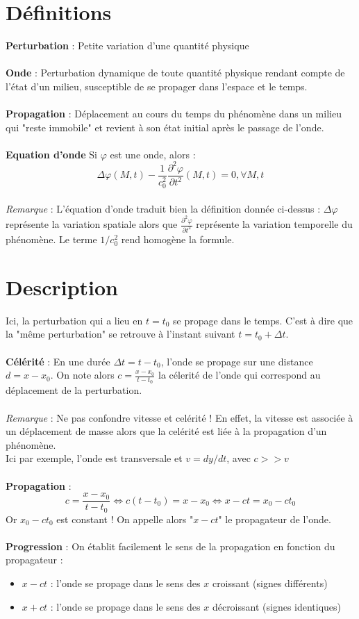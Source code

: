 \section{Définitions}
\noindent\textbf{Perturbation} : Petite variation d'une quantité physique \\ \\
\textbf{Onde} : Perturbation dynamique de toute quantité physique rendant compte de l'état d'un milieu, susceptible de se propager dans l'espace et le temps.\\ \\
\textbf{Propagation} : Déplacement au cours du temps du phénomène dans un milieu qui "reste immobile" et revient à son état initial après le passage de l'onde. \\ \\
\textbf{Equation d'onde} Si $\varphi$ est une onde, alors :
\[\Delta\varphi(M,t)-\frac{1}{c_0^2}\frac{\partial^2\varphi}{\partial t^2}(M,t)=0, \forall M, t\]\\
\emph{Remarque} : L'équation d'onde traduit bien la définition donnée ci-dessus : $\Delta\varphi$ représente la variation spatiale alors que $\frac{\partial^2\varphi}{\partial t^2}$ représente la variation temporelle du phénomène. Le terme $1/c_0^2$ rend homogène la formule. 
\section{Description}
Ici, la perturbation qui a lieu en $t=t_0$ se propage dans le temps. C'est à dire que la "même perturbation" se retrouve à l'instant suivant $t=t_0+\Delta t$.\\ \\
\textbf{Célérité} : En une durée $\Delta t = t-t_0$, l'onde se propage sur une distance $d=x-x_0$. On note alors $c=\frac{x-x_0}{t-t_0}$ la célerité de l'onde qui correspond au déplacement de la perturbation.\\ \\
\emph{Remarque} : Ne pas confondre vitesse et celérité ! En effet, la vitesse est associée à un déplacement de masse alors que la celérité est liée à la propagation d'un phénomène. \\
Ici par exemple, l'onde est transversale et $v=dy/dt$, avec $c>>v$ \\ \\
\textbf{Propagation} : \[ c=\frac{x-x_0}{t-t_0} \Leftrightarrow c(t-t_0) = x-x_0 \Leftrightarrow x-ct=x_0-ct_0 \]
Or $x_0-ct_0$ est constant ! On appelle alors "$x-ct$" le propagateur de l'onde. \\ \\
\textbf{Progression} : On établit facilement le sens de la propagation en fonction du propagateur : 
\begin{itemize}
  \item $x-ct$ : l'onde se propage dans le sens des $x$ croissant (signes différents)
  \item $x+ct$ : l'onde se propage dans le sens des $x$ décroissant (signes identiques)\\
\end{itemize}

